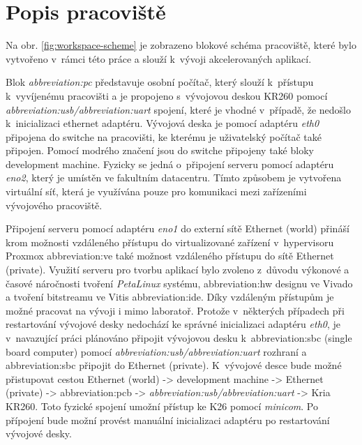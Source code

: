\documentclass[a4paper, twoside, 11pt]{article}
\begin{document}
\section{Popis pracoviště}\label{sec:popis-pracoviste}
	Na obr. \ref{fig:workspace-scheme} je zobrazeno blokové schéma pracoviště, které bylo vytvořeno v~rámci této práce a slouží k~vývoji akcelerovaných aplikací.\par
	Blok \textit{\gls{abbreviation:pc}} představuje osobní počítač, který slouží k~přístupu k~vyvíjenému pracovišti a je propojeno s~vývojovou deskou KR260 pomocí \textit{\gls{abbreviation:usb}/\gls{abbreviation:uart}} spojení, které je vhodné v~případě, že nedošlo k~inicializaci ethernet adaptéru. Vývojová deska je pomocí adaptéru \textit{eth0} připojena do switche na pracovišti, ke kterému je uživatelský počítač také připojen. Pomocí \textcolor{ctublue}{modrého značení} jsou do switche připojeny také bloky \textcolor{ctuorange}{development machine}. Fyzicky se jedná o~připojení serveru pomocí adaptéru \textit{eno2}, který je umístěn ve fakultním datacentru. Tímto způsobem je vytvořena virtuální síť, která je využívána pouze pro komunikaci mezi zařízeními vývojového pracoviště.\par
	Připojení serveru pomocí adaptéru \textit{eno1} do externí sítě \textcolor{ctugreenyblue}{Ethernet (world)} přináší krom možnosti vzdáleného přístupu do virtualizované zařízení v~hypervisoru Proxmox \gls{abbreviation:ve} také možnost vzdáleného přístupu do sítě \textcolor{ctublue}{Ethernet (private)}. Využití serveru pro tvorbu aplikací bylo zvoleno z~důvodu výkonové a časové náročnosti tvoření \textit{PetaLinux} systému, \gls{abbreviation:hw} designu ve Vivado a tvoření bitstreamu ve Vitis \gls{abbreviation:ide}. Díky vzdáleným přístupům je možné pracovat na vývoji i mimo laboratoř. Protože v~některých případech při restartování vývojové desky nedochází ke správné inicializaci adaptéru \textit{eth0}, je v~navazující práci plánováno připojit vývojovou desku k~\gls{abbreviation:sbc} (single board computer) pomocí \textit{\gls{abbreviation:usb}/\gls{abbreviation:uart}} rozhraní a \gls{abbreviation:sbc} připojit do \textcolor{ctublue}{Ethernet (private)}. K~vývojové desce bude možné přistupovat cestou \textcolor{ctugreenyblue}{Ethernet (world)} -> \textcolor{ctuorange}{development machine} -> \textcolor{ctublue}{Ethernet (private)} -> \gls{abbreviation:pcb} -> \textit{\gls{abbreviation:usb}/\gls{abbreviation:uart}} -> Kria KR260. Toto fyzické spojení umožní přístup ke K26 pomocí \textit{minicom}. Po přípojení bude možní provést manuální inicializaci adaptéru po restartování vývojové desky.\par
\end{document}
